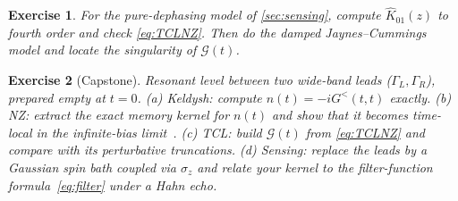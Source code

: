 \documentclass[11pt]{article}
\newcommand{\Gc}{\mathcal{G}}
\newtheorem{exercise}{Exercise}
\begin{document}
\begin{exercise}\label{ex:tcl}
For the pure-dephasing model of \cref{sec:sensing}, compute $\hat K_{01}(z)$ to fourth order and
check \cref{eq:TCLNZ}. Then do the damped Jaynes--Cummings model and locate the
singularity of $\Gc(t)$.
\end{exercise}

\begin{exercise}[Capstone]\label{ex:capstone}
Resonant level between two wide-band leads ($\Gamma_L,\Gamma_R$), prepared empty at $t=0$.
(a) Keldysh: compute $n(t)=-iG^<(t,t)$ exactly. (b) NZ: extract the exact memory kernel for
$n(t)$ and show that it becomes time-local in the infinite-bias limit~\cite{GurvitzPrager1996}.
(c) TCL: build $\Gc(t)$ from \cref{eq:TCLNZ} and compare with its perturbative truncations.
(d) Sensing: replace the leads by a Gaussian spin bath coupled via $\sigma_z$ and relate your
kernel to the filter-function formula~\eqref{eq:filter} under a Hahn echo.
\end{exercise}



\end{document}

